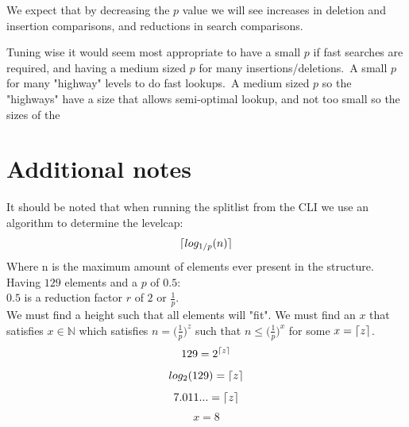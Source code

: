 \documentclass[oneside]{scrbook}
\DeclarePairedDelimiter{\ceil}{\lceil}{\rceil}
\begin{document}
We expect that by decreasing the $p$ value we will see increases in deletion and insertion comparisons, and reductions in search comparisons.

Tuning wise it would seem most appropriate to have a small $p$ if fast searches are required, and having a medium sized $p$ for many insertions/deletions.\
A small $p$ for many "highway" levels to do fast lookups.\
A medium sized $p$ so the "highways" have a size that allows semi-optimal lookup, and not too small so the sizes of the

\section*{Additional notes}
It should be noted that when running the splitlist from the CLI we use an algorithm to determine the levelcap:
$$\ceil{log_{1/p}(n)}$$
Where n is the maximum amount of elements ever present in the structure.\\
Having $129$ elements and a $p$ of $0.5$:\\
$0.5$ is a reduction factor $r$ of $2$ or $\frac{1}{p}$.\\
We must find a height such that all elements will "fit".
We must find an $x$ that satisfies $x \in \mathbb{N}$ which satisfies $n = \Big( \frac{1}{p} \Big)^{z}$ such that $n \leq \Big( \frac{1}{p} \Big)^{x}$
for some $x = \ceil{z}$.
$$129 = 2^{\ceil{z}}$$
$$log_2(129) = \ceil{z}$$
$$7.011... = \ceil{z}$$
$$x = 8$$
\end{document}
